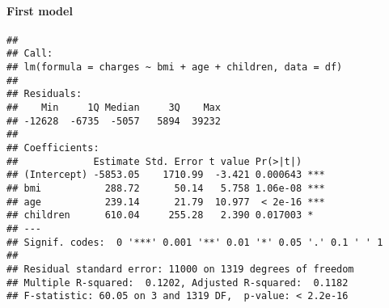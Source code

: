 \documentclass[
]{article}
\newenvironment{Shaded}{\begin{snugshade}}{\end{snugshade}}
\newcommand{\AttributeTok}[1]{\textcolor[rgb]{0.77,0.63,0.00}{#1}}
\newcommand{\CommentTok}[1]{\textcolor[rgb]{0.56,0.35,0.01}{\textit{#1}}}
\newcommand{\DecValTok}[1]{\textcolor[rgb]{0.00,0.00,0.81}{#1}}
\newcommand{\FunctionTok}[1]{\textcolor[rgb]{0.00,0.00,0.00}{#1}}
\newcommand{\NormalTok}[1]{#1}
\newcommand{\OtherTok}[1]{\textcolor[rgb]{0.56,0.35,0.01}{#1}}
\newcommand{\SpecialCharTok}[1]{\textcolor[rgb]{0.00,0.00,0.00}{#1}}
\newcommand{\StringTok}[1]{\textcolor[rgb]{0.31,0.60,0.02}{#1}}
\begin{document}
\hypertarget{first-model}{%
\paragraph{First model}\label{first-model}}

\begin{Shaded}
\end{Shaded}

\begin{verbatim}
## 
## Call:
## lm(formula = charges ~ bmi + age + children, data = df)
## 
## Residuals:
##    Min     1Q Median     3Q    Max 
## -12628  -6735  -5057   5894  39232 
## 
## Coefficients:
##             Estimate Std. Error t value Pr(>|t|)    
## (Intercept) -5853.05    1710.99  -3.421 0.000643 ***
## bmi           288.72      50.14   5.758 1.06e-08 ***
## age           239.14      21.79  10.977  < 2e-16 ***
## children      610.04     255.28   2.390 0.017003 *  
## ---
## Signif. codes:  0 '***' 0.001 '**' 0.01 '*' 0.05 '.' 0.1 ' ' 1
## 
## Residual standard error: 11000 on 1319 degrees of freedom
## Multiple R-squared:  0.1202, Adjusted R-squared:  0.1182 
## F-statistic: 60.05 on 3 and 1319 DF,  p-value: < 2.2e-16
\end{verbatim}

\begin{Shaded}
\end{Shaded}
\end{document}
